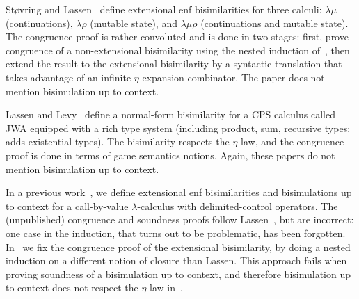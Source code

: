 \documentclass{lmcs}
\theoremstyle{defC}
\begin{document}
St{\o}vring and Lassen~\cite{Stoevring-Lassen:POPL07} define extensional enf
bisimilarities for three calculi: $\lambda\mu$ (continuations), $\lambda\rho$
(mutable state), and $\lambda\mu\rho$ (continuations and mutable state). The
congruence proof is rather convoluted and is done in two stages: first, prove
congruence of a non-extensional bisimilarity using the nested induction
of~\cite{Lassen:MFPS99}, then extend the result to the extensional bisimilarity
by a syntactic translation that takes advantage of an infinite $\eta$-expansion
combinator. The paper does not mention bisimulation up to context.

Lassen and Levy~\cite{Lassen-Levy:CSL07,Lassen-Levy:LICS08} define a normal-form
bisimilarity for a CPS calculus called JWA equipped with a rich type system
(including product, sum, recursive types;~\cite{Lassen-Levy:LICS08} adds
existential types). The bisimilarity respects the $\eta$-law, and the congruence
proof is done in terms of game semantics notions. Again, these papers do not
mention bisimulation up to context.

In a previous work~\cite{Biernacki-Lenglet:FLOPS12}, we define extensional enf
bisimilarities and bisimulations up to context for a call-by-value
$\lambda$-calculus with delimited-control operators. The (unpublished)
congruence and soundness proofs follow Lassen~\cite{Lassen:MFPS99}, but are
incorrect: one case in the induction, that turns out to be problematic, has been
forgotten. In~\cite{Biernacki-al:HAL15} we fix the congruence proof of the
extensional bisimilarity, by doing a nested induction on a different notion of
closure than Lassen. This approach fails when proving soundness of a
bisimulation up to context, and therefore bisimulation up to context does not
respect the $\eta$-law in~\cite{Biernacki-al:HAL15}.
\end{document}
